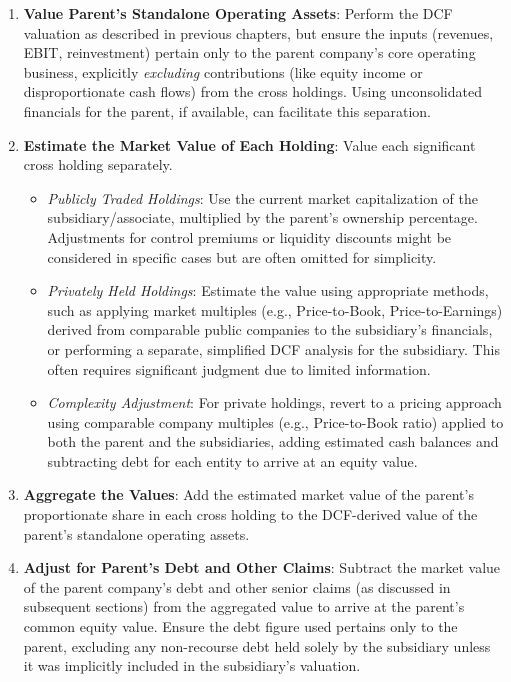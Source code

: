 \begin{enumerate}
    \item \textbf{Value Parent's Standalone Operating Assets}: Perform the DCF valuation as described in previous chapters, but ensure the inputs (revenues, EBIT, reinvestment) pertain only to the parent company's core operating business, explicitly \textit{excluding} contributions (like equity income or disproportionate cash flows) from the cross holdings. Using unconsolidated financials for the parent, if available, can facilitate this separation.
    \item \textbf{Estimate the Market Value of Each Holding}: Value each significant cross holding separately.
          \begin{itemize}
              \item \textit{Publicly Traded Holdings}: Use the current market capitalization of the subsidiary/associate, multiplied by the parent's ownership percentage. Adjustments for control premiums or liquidity discounts might be considered in specific cases but are often omitted for simplicity.
              \item \textit{Privately Held Holdings}: Estimate the value using appropriate methods, such as applying market multiples (e.g., Price-to-Book, Price-to-Earnings) derived from comparable public companies to the subsidiary's financials, or performing a separate, simplified DCF analysis for the subsidiary. This often requires significant judgment due to limited information.
              \item \textit{Complexity Adjustment}: For private holdings, revert to a pricing approach using comparable company multiples (e.g., Price-to-Book ratio) applied to both the parent and the subsidiaries, adding estimated cash balances and subtracting debt for each entity to arrive at an equity value.
          \end{itemize}
    \item \textbf{Aggregate the Values}: Add the estimated market value of the parent's proportionate share in each cross holding to the DCF-derived value of the parent's standalone operating assets.
    \item \textbf{Adjust for Parent's Debt and Other Claims}: Subtract the market value of the parent company's debt and other senior claims (as discussed in subsequent sections) from the aggregated value to arrive at the parent's common equity value. Ensure the debt figure used pertains only to the parent, excluding any non-recourse debt held solely by the subsidiary unless it was implicitly included in the subsidiary's valuation.
\end{enumerate}

